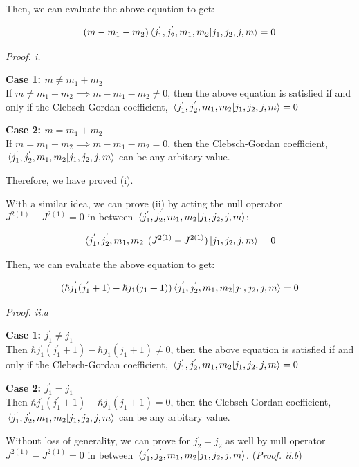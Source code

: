 \documentclass{article}
\begin{document}
Then, we can evaluate the above equation to get:

\begin{equation}
  (m - m_1 - m_2) \bra*{j_1^{'}, j_2^{'}, m_1, m_2} \ket{j_1, j_2, j, m} = 0
\end{equation}

\textit{Proof. i.}

\textbf{Case 1: $m \neq m_1 + m_2$} \\
If $m \neq m_1 + m_2 \implies m - m_1 - m_2 \neq 0$, then the above equation is 
satisfied if and only if the Clebsch-Gordan coefficient, $\bra*{j_1^{'}, j_2^{'}, m_1, m_2} \ket{j_1, j_2, j, m} = 0$

\textbf{Case 2: $m = m_1 + m_2$} \\
If $m = m_1 + m_2 \implies m - m_1 - m_2 = 0$, then the Clebsch-Gordan coefficient, $\bra*{j_1^{'}, j_2^{'}, m_1, m_2} \ket{j_1, j_2, j, m}$ 
can be any arbitary value.

Therefore, we have proved (i).

With a similar idea, we can prove (ii) by acting the null operator $J^{2 (1)} - J^{2(1)} = 0$ in between
$\bra*{j_1^{'}, j_2^{'}, m_1, m_2} \ket{j_1, j_2, j, m}$:

\begin{equation}
  \bra*{j_1^{'}, j_2^{'}, m_1, m_2} (J^{2(1)} - J^{2(1)}) \ket{j_1, j_2, j, m} = 0
\end{equation}

Then, we can evaluate the above equation to get:

\begin{equation}
  (\hbar j_1^{'}(j_1^{'}+1) - \hbar j_1(j_1+1)) \bra*{j_1^{'}, j_2^{'}, m_1, m_2} \ket{j_1, j_2, j, m} = 0
\end{equation}

\textit{Proof. ii.a}

\textbf{Case 1: $j_1^{'} \neq j_1$} \\
Then $\hbar j_1^{'}(j_1^{'}+1) - \hbar j_1(j_1+1) \neq 0$, then the above equation is
satisfied if and only if the Clebsch-Gordan coefficient, $\bra*{j_1^{'}, j_2^{'}, m_1, m_2} \ket{j_1, j_2, j, m} = 0$

\textbf{Case 2: $j_1^{'} = j_1$} \\
Then $\hbar j_1^{'}(j_1^{'}+1) - \hbar j_1(j_1+1) = 0$, then the Clebsch-Gordan coefficient, $\bra*{j_1^{'}, j_2^{'}, m_1, m_2} \ket{j_1, j_2, j, m}$
can be any arbitary value.

Without loss of generality, we can prove for $j_2^{'} = j_2$ as well by null operator $J^{2 (1)} - J^{2(1)} = 0$ in between
$\bra*{j_1^{'}, j_2^{'}, m_1, m_2} \ket{j_1, j_2, j, m}$. (\textit{Proof. ii.b})
\end{document}
